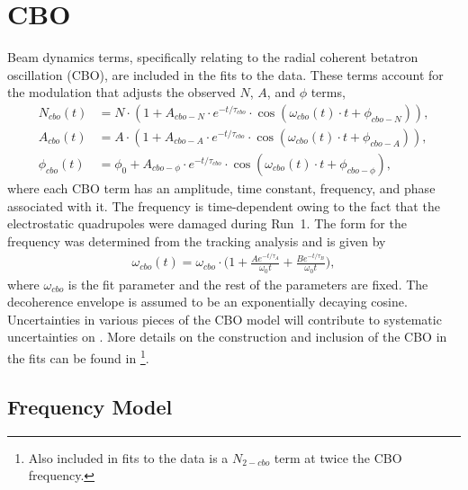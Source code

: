 
\graphicspath{{Body/Figures/CBO/}{Body/Figures/CBO/Frequency/}{Body/Figures/CBO/TimeConstants/}}

\section{CBO}


Beam dynamics terms, specifically relating to the radial coherent betatron oscillation (CBO), are included in the fits to the data. These terms account for the modulation that adjusts the observed $N$, $A$, and $\phi$ terms,
    \begin{align}
        N_{cbo}(t) &= N \cdot (1 + A_{cbo-N} \cdot e^{-t/\tau_{cbo}} \cdot \cos(\omega_{cbo}(t) \cdot t + \phi_{cbo-N})), \label{eq:Ncbo} \\ 
        A_{cbo}(t) &= A \cdot (1 + A_{cbo-A} \cdot e^{-t/\tau_{cbo}} \cdot \cos(\omega_{cbo}(t) \cdot t + \phi_{cbo-A})), \label{eq:Acbo} \\ 
        \phi_{cbo}(t) &= \phi_{0} + A_{cbo-\phi} \cdot e^{-t/\tau_{cbo}} \cdot \cos(\omega_{cbo}(t) \cdot t + \phi_{cbo-\phi}), \label{eq:Phicbo}
    \end{align}
where each CBO term has an amplitude, time constant, frequency, and phase associated with it. The frequency is time-dependent owing to the fact that the electrostatic quadrupoles were damaged during Run~1. The form for the frequency was determined from the tracking analysis and is given by
    \begin{align} \label{eq:CBOfreqForm}
        \omega_{cbo}(t) = \omega_{cbo} \cdot \Big(1 + \frac{Ae^{-t/\tau_{A}}}{\omega_{0}t} + \frac{Be^{-t/\tau_{B}}}{\omega_{0}t}\Big),
    \end{align}
where $\omega_{cbo}$ is the fit parameter and the rest of the parameters are fixed. The decoherence envelope is assumed to be an exponentially decaying cosine. Uncertainties in various pieces of the CBO model will contribute to systematic uncertainties on \R. More details on the construction and inclusion of the CBO in the fits can be found in \footnote{Also included in fits to the data is a $N_{2-cbo}$ term at twice the CBO frequency.}.


\subsection{Frequency Model}

